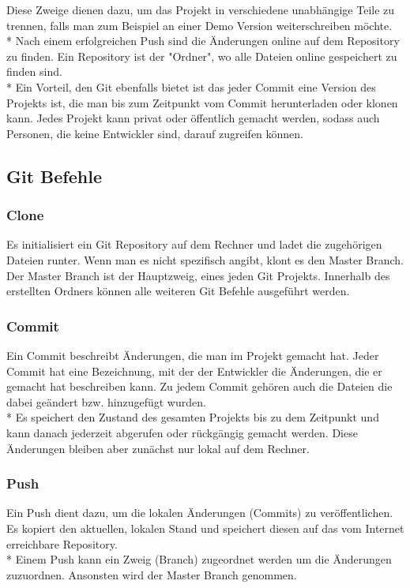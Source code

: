 Diese Zweige dienen dazu, um das Projekt in verschiedene
unabhängige Teile zu trennen, falls man zum Beispiel an einer Demo Version weiterschreiben möchte. \\* Nach einem erfolgreichen Push sind die Änderungen
online auf dem Repository zu finden. Ein Repository ist der "Ordner", wo alle Dateien online gespeichert zu finden sind. 
\\* Ein Vorteil, den Git ebenfalls bietet ist das jeder Commit eine Version des Projekts ist, die man bis zum Zeitpunkt vom Commit herunterladen oder klonen kann.
Jedes Projekt kann privat oder öffentlich gemacht werden, sodass auch Personen, die keine Entwickler sind, darauf zugreifen können.
\cite{GitExpl} 



\subsection{Git Befehle}

\subsubsection{Clone}
\label{sec:Clone}
Es initialisiert ein Git Repository auf dem Rechner und ladet die zugehörigen Dateien runter.
Wenn man es nicht spezifisch angibt, klont es den Master Branch. Der Master Branch ist der Hauptzweig, eines jeden Git Projekts.
Innerhalb des erstellten Ordners können alle weiteren Git Befehle ausgeführt werden. \cite{GitCmnds}
\subsubsection{Commit}
\label{sec:Commit}
Ein Commit beschreibt Änderungen, die man im Projekt gemacht hat. Jeder Commit hat eine Bezeichnung, mit der der Entwickler die Änderungen,
die er gemacht hat beschreiben kann. Zu jedem Commit gehören auch die Dateien die dabei geändert bzw. hinzugefügt wurden.
\\* Es speichert den Zustand des gesamten Projekts bis zu dem Zeitpunkt und kann danach jederzeit abgerufen oder rückgängig gemacht werden.
Diese Änderungen bleiben aber zunächst nur lokal auf dem Rechner. \cite{GitCmnds}

\subsubsection{Push}
\label{sec:Push}

Ein Push dient dazu, um die lokalen Änderungen (Commits) zu veröffentlichen. Es kopiert den aktuellen, lokalen Stand und speichert diesen auf 
das vom Internet erreichbare Repository. \\* Einem Push kann ein Zweig (Branch) zugeordnet werden um die Änderungen zuzuordnen. 
Ansonsten wird der Master Branch genommen. \cite{GitCmnds}

